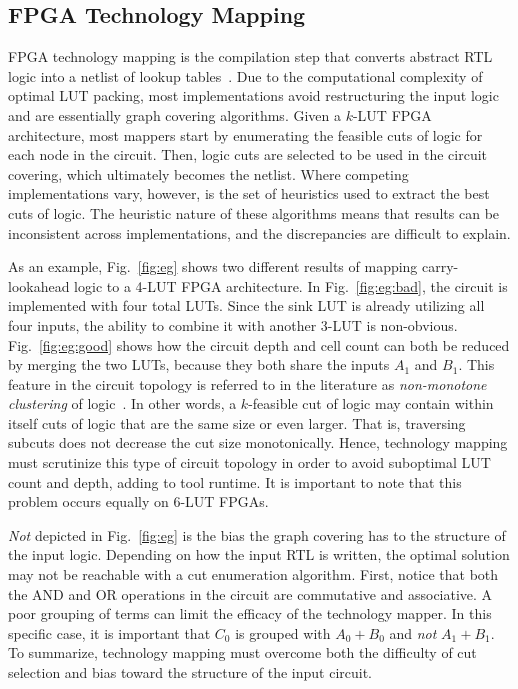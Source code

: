 \subsection{FPGA Technology Mapping}\label{sec:background:fpga}
FPGA technology mapping is the compilation step that converts abstract RTL
logic into a netlist of lookup tables~\cite{flowmap, daomap, attmap, imap,
    wiremap}. Due to the computational complexity of optimal LUT packing, most
implementations avoid restructuring the input logic and are essentially graph
covering algorithms. Given a $k$-LUT FPGA architecture, most mappers start by
enumerating the feasible cuts of logic for each node in the circuit. Then,
logic cuts are selected to be used in the circuit covering, which ultimately
becomes the netlist. Where competing implementations vary, however, is the set
of heuristics used to extract the best cuts of logic. The heuristic nature of
these algorithms means that results can be inconsistent across implementations,
and the discrepancies are difficult to explain.

As an example, Fig.~\ref{fig:eg} shows two different results of mapping
carry-lookahead logic to a 4-LUT FPGA architecture. In Fig.~\ref{fig:eg:bad},
the circuit is implemented with four total LUTs. Since the sink LUT is already
utilizing all four inputs, the ability to combine it with another 3-LUT is
non-obvious. Fig.~\ref{fig:eg:good} shows how the circuit depth and cell count
can both be reduced by merging the two LUTs, because they both share the inputs
$A_1$ and $B_1$. This feature in the circuit topology is referred to in the
literature as \textit{non-monotone clustering} of logic~\cite{flowmap}. In
other words, a $k$-feasible cut of logic may contain within itself cuts of
logic that are the same size or even larger. That is, traversing subcuts does
not decrease the cut size monotonically. Hence, technology mapping must
scrutinize this type of circuit topology in order to avoid suboptimal LUT count
and depth, adding to tool runtime. It is important to note that this problem
occurs equally on 6-LUT FPGAs.

\textit{Not} depicted in Fig.~\ref{fig:eg} is the bias the graph
covering has to the structure of the input logic. Depending on how the input
RTL is written, the optimal solution may not be reachable with a cut
enumeration algorithm. First, notice that both the AND and OR operations in the
circuit are commutative and associative. A poor grouping of terms can limit the
efficacy of the technology mapper. In this specific case, it is important that
$C_0$ is grouped with $A_0 + B_0$ and \textit{not} $A_1 + B_1$. To summarize,
technology mapping must overcome both the difficulty of cut selection
and bias toward the structure of the input circuit.

